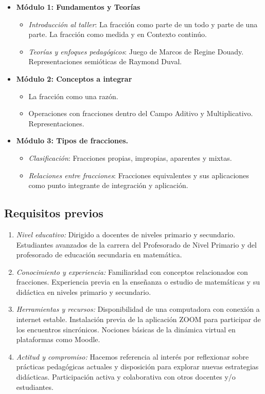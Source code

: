 \begin{itemize}
	\item \textbf{Módulo 1: Fundamentos y Teorías}
	\begin{itemize}
		\item \textit{Introducción al taller}: La fracción como parte de un todo y parte de una parte. La fracción como medida y en Contexto continúo.
		\item \textit{Teorías y enfoques pedagógicos}: Juego de Marcos de Regine Douady. Representaciones semióticas de Raymond Duval.
	\end{itemize}
	
	\item \textbf{Módulo 2: Conceptos a integrar}
	\begin{itemize}
		\item La fracción como una razón.
		\item Operaciones con fracciones dentro del Campo Aditivo y Multiplicativo. Representaciones.
	\end{itemize}
	
	\item \textbf{Módulo 3: Tipos de fracciones.}
	\begin{itemize}
		\item \textit{Clasificación}: Fracciones propias, impropias, aparentes y mixtas.
		\item \textit{Relaciones entre fracciones}: Fracciones equivalentes y sus aplicaciones como punto integrante de integración y aplicación.
	\end{itemize}
\end{itemize}

\subsection{Requisitos previos}

\begin{enumerate}[3.1-]
	\item \textit{Nivel educativo:} Dirigido a docentes de niveles primario y secundario. Estudiantes avanzados de la carrera del Profesorado de Nivel Primario y del profesorado de educación secundaria en matemática.
	\item \textit{Conocimiento y experiencia:} Familiaridad con conceptos relacionados con fracciones. Experiencia previa en la enseñanza o estudio de matemáticas y su didáctica en niveles primario y secundario.
	\item \textit{Herramientas y recursos:} Disponibilidad de una computadora con conexión a internet estable. Instalación previa de la aplicación ZOOM para participar de los encuentros sincrónicos. Nociones básicas de la dinámica virtual en plataformas como Moodle.
	\item \textit{Actitud y compromiso:} Hacemos referencia al interés por reflexionar sobre prácticas pedagógicas actuales y disposición para explorar nuevas estrategias didácticas. Participación activa y colaborativa con otros docentes y/o estudiantes.
\end{enumerate}

